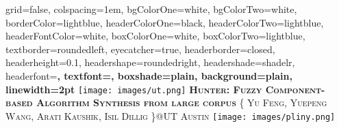 \documentclass[landscape,final,a0paper,fontscale=0.285]{baposter}
\begin{document}
\begin{poster}%
  {
  grid=false,
  colspacing=1em,
  bgColorOne=white,
  bgColorTwo=white,
  borderColor=lightblue,
  headerColorOne=black,
  headerColorTwo=lightblue,
  headerFontColor=white,
  boxColorOne=white,
  boxColorTwo=lightblue,
  textborder=roundedleft,
  eyecatcher=true,
  headerborder=closed,
  headerheight=0.1\textheight,
  headershape=roundedright,
  headershade=shadelr,
  headerfont=\Large\bf\textsc, %
  textfont={\setlength{\parindent}{1.5em}},
  boxshade=plain,
  background=plain,
  linewidth=2pt
  }
  {\texttt{[image: images/ut.png]}} 
  {\bf\textsc{Hunter: Fuzzy Component-based Algorithm Synthesis from large corpus}\vspace{0.1em}}
  {\textsc{\{ Yu Feng, Yuepeng Wang, Arati Kaushik, Isil Dillig \}@UT Austin}}
  {%
    \texttt{[image: images/pliny.png]}
  }

    \newcommand{\colouredcircle}{%
      \tikz{\useasboundingbox (-0.2em,-0.32em) rectangle(0.2em,0.32em); \draw[draw=black,fill=lightblue,line width=0.03em] (0,0) circle(0.18em);}}

\end{poster}
\end{document}
